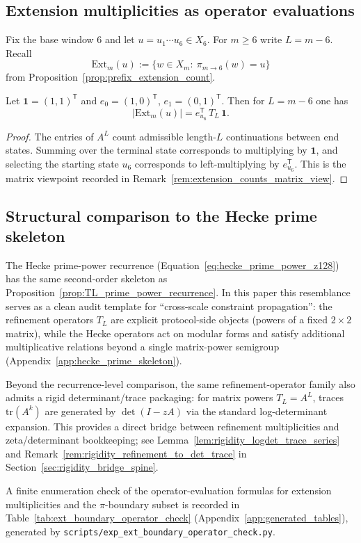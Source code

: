 \subsection{Extension multiplicities as operator evaluations}
\label{subsec:ext_counts_operator_eval}

Fix the base window $6$ and let $u=u_1\cdots u_6\in X_6$.
For $m\ge 6$ write $L=m-6$.
Recall
\[
\mathrm{Ext}_m(u):=\{w\in X_m:\ \pi_{m\to 6}(w)=u\}
\]
from Proposition~\ref{prop:prefix_extension_count}.

\begin{proposition}\label{prop:ext_count_operator_formula}
\MathTag Let $\mathbf{1}=(1,1)^{\mathsf{T}}$ and $e_0=(1,0)^{\mathsf{T}}$, $e_1=(0,1)^{\mathsf{T}}$.
Then for $L=m-6$ one has
\[
|\mathrm{Ext}_m(u)|=e_{u_6}^{\mathsf{T}}\,T_L\,\mathbf{1}.
\]
\end{proposition}
\begin{proof}
The entries of $A^L$ count admissible length-$L$ continuations between end states.
Summing over the terminal state corresponds to multiplying by $\mathbf{1}$, and selecting the starting state $u_6$ corresponds to left-multiplying by $e_{u_6}^{\mathsf{T}}$.
This is the matrix viewpoint recorded in Remark~\ref{rem:extension_counts_matrix_view}.
\end{proof}

\subsection{Structural comparison to the Hecke prime skeleton}
\label{subsec:protocol_hecke_comparison}

\AuditTag The Hecke prime-power recurrence (Equation~\eqref{eq:hecke_prime_power_z128}) has the same second-order skeleton as Proposition~\ref{prop:TL_prime_power_recurrence}.
In this paper this resemblance serves as a clean audit template for ``cross-scale constraint propagation'':
the refinement operators $T_L$ are explicit protocol-side objects (powers of a fixed $2\times2$ matrix),
while the Hecke operators act on modular forms and satisfy additional multiplicative relations beyond a single matrix-power semigroup (Appendix~\ref{app:hecke_prime_skeleton}).

\AuditTag Beyond the recurrence-level comparison, the same refinement-operator family also admits a rigid determinant/trace packaging:
for matrix powers $T_L=A^L$, traces $\mathrm{tr}(A^k)$ are generated by $\det(I-zA)$ via the standard log-determinant expansion.
This provides a direct bridge between refinement multiplicities and zeta/determinant bookkeeping; see Lemma~\ref{lem:rigidity_logdet_trace_series} and Remark~\ref{rem:rigidity_refinement_to_det_trace} in Section~\ref{sec:rigidity_bridge_spine}.

\AuditTag A finite enumeration check of the operator-evaluation formulas for extension multiplicities and the $\pi$-boundary subset is recorded in Table~\ref{tab:ext_boundary_operator_check} (Appendix~\ref{app:generated_tables}), generated by \texttt{scripts/exp\_ext\_boundary\_operator\_check.py}.


